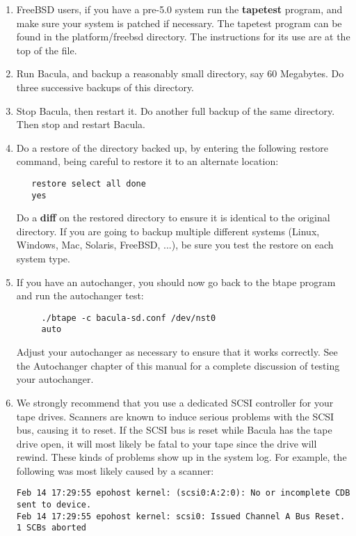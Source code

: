 \begin{enumerate}
\item FreeBSD users, if you have a pre-5.0 system run the {\bf tapetest}
   program, and make sure your system is patched if necessary. The tapetest
   program can be found in the platform/freebsd directory. The instructions
   for its use are at the top of the file.

\item Run Bacula, and backup a reasonably small directory, say 60
   Megabytes.  Do three successive backups of this directory.

\item Stop Bacula, then restart it.  Do another full backup of the same
   directory.  Then stop and restart Bacula.

\item Do a restore of the directory backed up, by entering the  following
   restore command, being careful to restore it to  an alternate location:


\footnotesize
\begin{verbatim}
   restore select all done
   yes

\end{verbatim}
\normalsize

   Do a {\bf diff} on the restored directory to ensure it is identical  to the
   original directory. If you are going to backup multiple different systems
   (Linux, Windows, Mac, Solaris, FreeBSD, ...), be sure you test the restore
   on each system type.

\item If you have an autochanger, you should now go back to the  btape program
   and run the autochanger test:

\footnotesize
\begin{verbatim}
     ./btape -c bacula-sd.conf /dev/nst0
     auto

\end{verbatim}
\normalsize

   Adjust your autochanger as necessary to ensure that it works  correctly. See
   the Autochanger chapter of this manual  for a complete discussion of testing
   your autochanger.

\item We strongly recommend that you use a dedicated SCSI
   controller for your tape drives. Scanners are known to induce
   serious problems with the SCSI bus, causing it to reset. If the
   SCSI bus is reset while Bacula has the tape drive open, it will
   most likely be fatal to your tape since the drive will rewind.
   These kinds of problems show up in the system log. For example,
   the following was most likely caused by a scanner:

\footnotesize
\begin{verbatim}
Feb 14 17:29:55 epohost kernel: (scsi0:A:2:0): No or incomplete CDB sent to device.
Feb 14 17:29:55 epohost kernel: scsi0: Issued Channel A Bus Reset. 1 SCBs aborted
\end{verbatim}
\normalsize

\end{enumerate}

